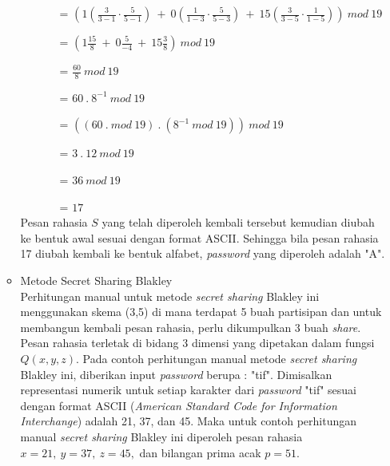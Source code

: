 \documentclass[a4paper,twoside]{article}
\begin{document}
\begin{enumerate}
\begin{itemize}
\vspace{5pt}

\ \ \ \ \ \ \ = $\left( 1 \left( \frac{3}{3-1} \cdot \frac{5}{5-1} \right) \ + \ 0 \left( \frac{1}{1-3} \cdot \frac{5}{5-3}\right) \ + \ 15 \left( \frac{3}{3-5} \cdot \frac{1}{1-5}\right) \right) \ mod \ 19$ 

\vspace{5pt}

\ \ \ \ \ \ \ = $\left( 1 \frac{15}{8} \ + \ 0 \frac{5}{-4} \ + \ 15 \frac{3}{8} \right) \ mod \ 19$ 

\vspace{5pt}

\ \ \ \ \ \ \ = $\frac{60}{8} \ mod \ 19$ 

\vspace{5pt}

\ \ \ \ \ \ \ = $60 \ . \ 8^{-1} \ mod \ 19$ 

\vspace{5pt}

\ \ \ \ \ \ \ = $\left( \left( 60 \ . \ mod \ 19 \right) \ . \ \left( 8^{-1} \ mod \ 19 \right) \right) \ mod \ 19$ 

\vspace{5pt}

\ \ \ \ \ \ \ = $3 \ . \ 12 \ mod \ 19$ 

\vspace{5pt}

\ \ \ \ \ \ \ = $36 \ mod \ 19$ 

\vspace{5pt}

\ \ \ \ \ \ \ = $17$ \\ 

Pesan rahasia $S$ yang telah diperoleh kembali tersebut kemudian diubah ke bentuk awal sesuai dengan format ASCII. Sehingga bila pesan rahasia 17 diubah kembali ke bentuk alfabet, \textit{password} yang diperoleh adalah "A".

\vspace{15pt}

\item Metode Secret Sharing Blakley \\
Perhitungan manual untuk metode \textit{secret sharing} Blakley ini menggunakan skema (3,5) di mana terdapat 5 buah partisipan dan untuk membangun kembali pesan rahasia, perlu dikumpulkan 3 buah \textit{share}. Pesan rahasia terletak di bidang 3 dimensi yang dipetakan dalam fungsi $Q(x,y,z)$. Pada contoh perhitungan manual metode \textit{secret sharing} Blakley ini, diberikan input \textit{password} berupa : "tif". Dimisalkan representasi numerik untuk setiap karakter dari \textit{password} "tif" sesuai dengan format ASCII (\textit{American Standard Code for Information Interchange}) adalah 21, 37, dan 45. Maka untuk contoh perhitungan manual \textit{secret sharing} Blakley ini diperoleh pesan rahasia $x=21, \ y=37, \ z = 45,$ dan bilangan prima acak $p=51$. \\


\end{itemize}
\end{enumerate}
\end{document}
